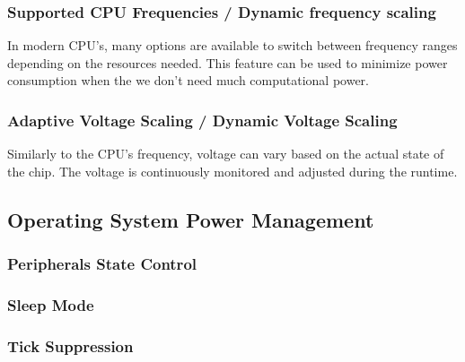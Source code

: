 \subsubsection{Supported CPU Frequencies / Dynamic frequency scaling}
In modern CPU's, many options are available to switch between frequency ranges depending on the resources needed.
This feature can be used to minimize power consumption when the we don't need much computational power.

\subsubsection{Adaptive Voltage Scaling / Dynamic Voltage Scaling}
Similarly to the CPU's frequency, voltage can vary based on the actual state of the chip.
The voltage is continuously monitored and adjusted during the runtime.


\subsection{Operating System Power Management}

\subsubsection{Peripherals State Control}

\subsubsection{Sleep Mode}

\subsubsection{Tick Suppression}